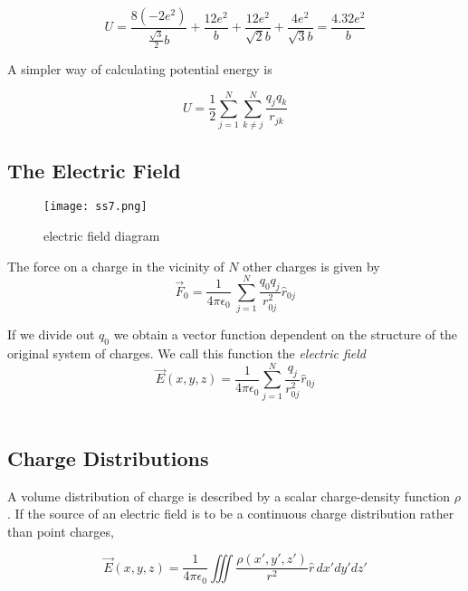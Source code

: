 \documentclass[svgnames]{article}
\begin{document}
\[ U = \frac{8 (-2e^2)}{\frac{\sqrt{3}}{2}b} + \frac{12e^2}{b}
+ \frac{12e^2}{\sqrt{2}b} + \frac{4e^2}{\sqrt{3}b} = \frac{4.32e^2}{b} \] 

A simpler way of calculating potential energy is \\

\begin{tcolorbox}

\[ U = \frac{1}{2}\sum_{j=1}^N \sum_{k\neq j}^N \frac{q_jq_k}{r_{jk}} \]

\end{tcolorbox}

\subsection{The Electric Field} 

\vspace{20px}

\begin{figure}[!hb]
  \centering
  \texttt{[image: ss7.png]}
  \caption{electric field diagram}
\end{figure}


\vspace{20px}

The force on a charge in the vicinity of $N$ other charges is given by \\ 

\[ \vec{F}_0 = \frac{1}{4\pi\epsilon_0} \ \sum_{j=1}^N \frac{q_0q_j}{r_{0j}^2}\hat{r}_{0j} \]

If we divide out $q_0$ we obtain a vector function dependent on the structure
of the original system of charges. We call this function the \textit{electric field} \\ 

\[ \vec{E}(x,y,z) = \frac{1}{4\pi\epsilon_0}\sum_{j=1}^N \frac{q_j}{r_{0j}^2}\hat{r}_{0j} \] \\


\subsection{Charge Distributions} 

A volume distribution of charge is described by a scalar charge-density
function $\rho$. If the source of an electric field is to be a continuous
charge distribution rather than point charges, \\

\begin{tcolorbox}[colback = red!5!white, colframe = red!50!black]

\[ \vec{E}(x,y,z) = \frac{1}{4\pi\epsilon_0} \iiint \frac{\rho(x',y',z')}{r^2} \hat{r} \, dx'dy'dz' \]

\end{tcolorbox}
\end{document}
